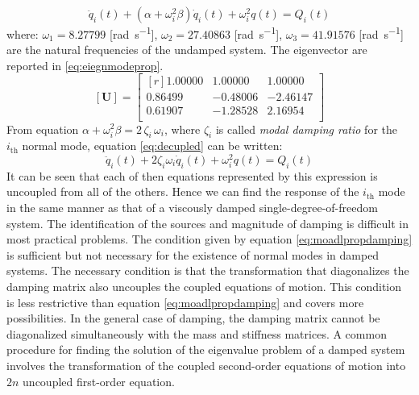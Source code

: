\begin{equation}\label{eq:decupled}
  \ddot{q}_{i}(t) + (\alpha + \omega_{i}^2\beta)\dot{q}_{i}(t) +
  \omega_{i}^{2}q(t) = Q_{i}(t)
\end{equation}
where: \(\omega_{1} = 8.27799\) [\si{\radian\per\second}],
\(\omega_{2} = 27.40863\) [\si{\radian\per\second}],
\(\omega_{3} = 41.91576\) [\si{\radian\per\second}] are
the natural frequencies of the undamped system.
The eigenvector are reported in \eqref{eq:eiegnmodeprop}.
\begin{equation}\label{eq:eiegnmodeprop}
	[\mathbf{U}] = \begin{bmatrix*}[r]
		1.00000 & 1.00000 & 1.00000 \\
		0.86499 &-0.48006 &-2.46147 \\
		0.61907 &-1.28528 & 2.16954 \\
 	\end{bmatrix*}
\end{equation}
From equation \(\alpha + \omega^{2}_{i}\beta = 2\,\zeta_{i}\,\omega_{i}\), where
\(\zeta_{i}\) is called \emph{modal damping ratio} for the \(i_\text{th}\) normal
mode, equation \eqref{eq:decupled} can be written:
\begin{equation}\label{eq:decupled2}
  \ddot{q}_{i}(t) + 2\zeta_{i}\omega_{i}\dot{q}_{i}(t) +
  \omega_{i}^{2}q(t) = Q_{i}(t)
\end{equation}
It can be seen that each of then equations represented by this expression is
uncoupled from all of the others.
Hence we can find the response of the \(i_\text{th}\) mode in the same manner
as that of a viscously damped single-degree-of-freedom system.
%
%
%
%
%
The identification of the sources and magnitude of damping is difficult in most
practical problems.
The condition given by equation \eqref{eq:moadlpropdamping} is sufficient but not
necessary for the existence of normal modes in damped systems.
The necessary condition is that the transformation that diagonalizes the damping
matrix also uncouples the coupled equations of motion.
This condition is less restrictive than equation \eqref{eq:moadlpropdamping}
and covers more possibilities.
In the general case of damping, the damping matrix cannot be diagonalized
simultaneously with the mass and stiffness matrices.
A common procedure for finding the solution of the eigenvalue problem of a
damped system involves the transformation of the coupled second-order
equations of motion into \(2n\) uncoupled first-order equation.
%


